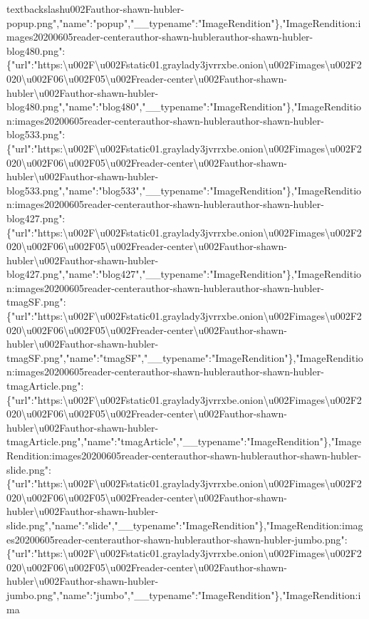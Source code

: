 textbackslash{}u002Fauthor-shawn-hubler-popup.png","name":"popup","\_\_typename":"ImageRendition"\},"ImageRendition:images20200605reader-centerauthor-shawn-hublerauthor-shawn-hubler-blog480.png":\{"url":"https:\textbackslash{}u002F\textbackslash{}u002Fstatic01.graylady3jvrrxbe.onion\textbackslash{}u002Fimages\textbackslash{}u002F2020\textbackslash{}u002F06\textbackslash{}u002F05\textbackslash{}u002Freader-center\textbackslash{}u002Fauthor-shawn-hubler\textbackslash{}u002Fauthor-shawn-hubler-blog480.png","name":"blog480","\_\_typename":"ImageRendition"\},"ImageRendition:images20200605reader-centerauthor-shawn-hublerauthor-shawn-hubler-blog533.png":\{"url":"https:\textbackslash{}u002F\textbackslash{}u002Fstatic01.graylady3jvrrxbe.onion\textbackslash{}u002Fimages\textbackslash{}u002F2020\textbackslash{}u002F06\textbackslash{}u002F05\textbackslash{}u002Freader-center\textbackslash{}u002Fauthor-shawn-hubler\textbackslash{}u002Fauthor-shawn-hubler-blog533.png","name":"blog533","\_\_typename":"ImageRendition"\},"ImageRendition:images20200605reader-centerauthor-shawn-hublerauthor-shawn-hubler-blog427.png":\{"url":"https:\textbackslash{}u002F\textbackslash{}u002Fstatic01.graylady3jvrrxbe.onion\textbackslash{}u002Fimages\textbackslash{}u002F2020\textbackslash{}u002F06\textbackslash{}u002F05\textbackslash{}u002Freader-center\textbackslash{}u002Fauthor-shawn-hubler\textbackslash{}u002Fauthor-shawn-hubler-blog427.png","name":"blog427","\_\_typename":"ImageRendition"\},"ImageRendition:images20200605reader-centerauthor-shawn-hublerauthor-shawn-hubler-tmagSF.png":\{"url":"https:\textbackslash{}u002F\textbackslash{}u002Fstatic01.graylady3jvrrxbe.onion\textbackslash{}u002Fimages\textbackslash{}u002F2020\textbackslash{}u002F06\textbackslash{}u002F05\textbackslash{}u002Freader-center\textbackslash{}u002Fauthor-shawn-hubler\textbackslash{}u002Fauthor-shawn-hubler-tmagSF.png","name":"tmagSF","\_\_typename":"ImageRendition"\},"ImageRendition:images20200605reader-centerauthor-shawn-hublerauthor-shawn-hubler-tmagArticle.png":\{"url":"https:\textbackslash{}u002F\textbackslash{}u002Fstatic01.graylady3jvrrxbe.onion\textbackslash{}u002Fimages\textbackslash{}u002F2020\textbackslash{}u002F06\textbackslash{}u002F05\textbackslash{}u002Freader-center\textbackslash{}u002Fauthor-shawn-hubler\textbackslash{}u002Fauthor-shawn-hubler-tmagArticle.png","name":"tmagArticle","\_\_typename":"ImageRendition"\},"ImageRendition:images20200605reader-centerauthor-shawn-hublerauthor-shawn-hubler-slide.png":\{"url":"https:\textbackslash{}u002F\textbackslash{}u002Fstatic01.graylady3jvrrxbe.onion\textbackslash{}u002Fimages\textbackslash{}u002F2020\textbackslash{}u002F06\textbackslash{}u002F05\textbackslash{}u002Freader-center\textbackslash{}u002Fauthor-shawn-hubler\textbackslash{}u002Fauthor-shawn-hubler-slide.png","name":"slide","\_\_typename":"ImageRendition"\},"ImageRendition:images20200605reader-centerauthor-shawn-hublerauthor-shawn-hubler-jumbo.png":\{"url":"https:\textbackslash{}u002F\textbackslash{}u002Fstatic01.graylady3jvrrxbe.onion\textbackslash{}u002Fimages\textbackslash{}u002F2020\textbackslash{}u002F06\textbackslash{}u002F05\textbackslash{}u002Freader-center\textbackslash{}u002Fauthor-shawn-hubler\textbackslash{}u002Fauthor-shawn-hubler-jumbo.png","name":"jumbo","\_\_typename":"ImageRendition"\},"ImageRendition:ima